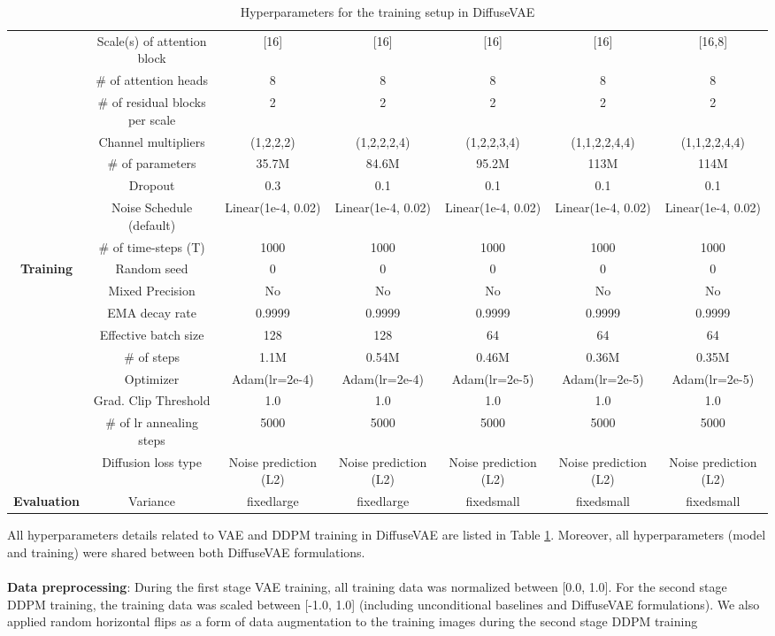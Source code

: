 \documentclass[10pt]{article} \usepackage[accepted]{tmlr}
\begin{document}
\begin{table}[t]
\begin{tabular}{@{}ccccccc@{}}
 & Scale(s) of attention block & [16] & [16] & [16] & [16] & [16,8] \\
 & \# of attention heads & 8 & 8 & 8 & 8 & 8 \\
 & \# of residual blocks per scale & 2 & 2 & 2 & 2 & 2 \\
 & Channel multipliers & (1,2,2,2) & (1,2,2,2,4) & (1,2,2,3,4) & (1,1,2,2,4,4) & (1,1,2,2,4,4) \\
 & \# of parameters & 35.7M & 84.6M & 95.2M & 113M & 114M \\
 & Dropout & 0.3 & 0.1 & 0.1 & 0.1 & 0.1 \\
 & Noise Schedule (default) & Linear(1e-4, 0.02) & Linear(1e-4, 0.02) & Linear(1e-4, 0.02) & Linear(1e-4, 0.02) & Linear(1e-4, 0.02) \\
 & \# of time-steps (T) & 1000 & 1000 & 1000 & 1000 & 1000 \\ \midrule
\multirow{9}{*}{\textbf{Training}} & Random seed & 0 & 0 & 0 & 0 & 0 \\
 & Mixed Precision & No & No & No & No & No \\
 & EMA decay rate & 0.9999 & 0.9999 & 0.9999 & 0.9999 & 0.9999 \\
 & Effective batch size & 128 & 128 & 64 & 64 & 64 \\
 & \# of steps & 1.1M & 0.54M & 0.46M & 0.36M & 0.35M \\
 & Optimizer & Adam(lr=2e-4) & Adam(lr=2e-4) & Adam(lr=2e-5) & Adam(lr=2e-5) & Adam(lr=2e-5) \\
 & Grad. Clip Threshold & 1.0 & 1.0 & 1.0 & 1.0 & 1.0 \\
 & \# of lr annealing steps & 5000 & 5000 & 5000 & 5000 & 5000 \\
 & Diffusion loss type & Noise prediction (L2) & Noise prediction (L2) & Noise prediction (L2) & Noise prediction (L2) & Noise prediction (L2) \\ \midrule
\multirow{1}{*}{\textbf{Evaluation}} & Variance & fixedlarge & fixedlarge & fixedsmall & fixedsmall & fixedsmall\\ \bottomrule
\end{tabular}
\caption{Hyperparameters for the training setup in DiffuseVAE}
\label{table:hyp_table}
\end{table}
All hyperparameters details related to VAE and DDPM training in DiffuseVAE are listed in Table \ref{table:hyp_table}. Moreover, all hyperparameters (model and training) were shared between both DiffuseVAE formulations. \\\\
\noindent
\textbf{Data preprocessing}: During the first stage VAE training, all training data was normalized between [0.0, 1.0]. For the second stage DDPM training, the training data was scaled between [-1.0, 1.0] (including unconditional baselines and DiffuseVAE formulations). We also applied random horizontal flips as a form of data augmentation to the training images during the second stage DDPM training\\
\end{document}
